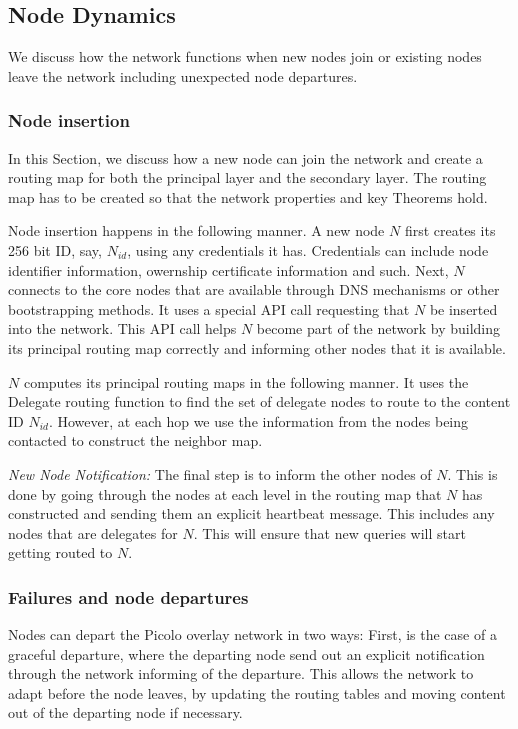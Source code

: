 \subsection{Node Dynamics}
\label{net:node_dynamics}

We discuss how the network functions when new nodes join or existing nodes leave the network including unexpected node
departures.

\subsubsection{Node insertion}

In this Section, we discuss how a new node can join the network and create a routing map for both the principal layer
and the secondary layer. The routing map has to be created so that the network properties and key Theorems hold.

Node insertion happens in the following manner. A new node \(N\) first creates its 256 bit ID,
say, \(N_{id}\), using any credentials it has. Credentials can include node identifier information, owernship
certificate information and such. Next, \( N \) connects to the core nodes that are available through DNS mechanisms or
other bootstrapping methods. It uses a special API call requesting that \(N\) be inserted into the network. This API
call helps \(N\) become part of the network by building its principal routing map correctly and informing other nodes
that it is available.

\(N\) computes its principal routing maps in the following manner. It uses the Delegate routing function to find the set of delegate
nodes to route to the content ID \(N_{id}\). However, at each hop we use the information from the nodes being contacted
to construct the neighbor map.

{\em New Node Notification:} The final step is to inform the other nodes of \(N\). This is done by going through the
nodes at each level in the routing map that \(N\) has constructed and sending them an explicit heartbeat message. This
includes any nodes that are delegates for \(N\). This will ensure that new queries will start getting routed to \(N\).

\subsubsection{Failures and node departures}

Nodes can depart the Picolo overlay network in two ways: First, is the case of a graceful departure, where the departing
node send out an explicit notification through the network informing of the departure. This allows the network to adapt
before the node leaves, by updating the routing tables and moving content out of the departing node if necessary.

